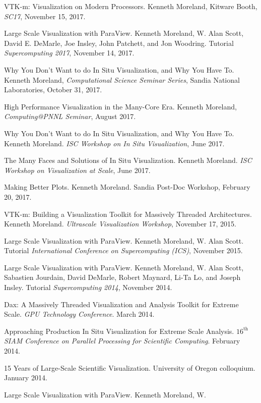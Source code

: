 \documentclass{article}
\begin{document}
\begin{enumerate}[label={[\arabic*]}]
\item VTK-m: Visualization on Modern Processors.
  Kenneth Moreland, Kitware Booth, \emph{SC17}, November 15, 2017.
\item Large Scale Visualization with ParaView.
  Kenneth Moreland, W. Alan Scott, David E. DeMarle, Joe Insley, John Patchett, and Jon Woodring.
  Tutorial \emph{Supercomputing 2017}, November 14, 2017.
\item Why You Don't Want to do In Situ Visualization, and Why You Have To.
  Kenneth Moreland, \emph{Computational Science Seminar Series}, Sandia National Laboratories, October 31, 2017.
\item High Performance Visualization in the Many-Core Era.
  Kenneth Moreland, \emph{Computing@PNNL Seminar}, August 2017.
\item Why You Don't Want to do In Situ Visualization, and Why You Have To.
  Kenneth Moreland.
  \emph{ISC Workshop on In Situ Visualization}, June 2017.
\item The Many Faces and Solutions of In Situ Visualization.
  Kenneth Moreland.
  \emph{ISC Workshop on Visualization at Scale}, June 2017.
\item Making Better Plots.
  Kenneth Moreland.
  Sandia Post-Doc Workshop, February 20, 2017.
\item VTK-m: Building a Visualization Toolkit for Massively Threaded Architectures.
  Kenneth Moreland.
  \emph{Ultrascale Visualization Workshop}, November 17, 2015.
\item Large Scale Visualization with ParaView. Kenneth Moreland, W.
  Alan Scott. Tutorial \emph{International Conference on Supercomputing
    (ICS)}, November 2015.
\item Large Scale Visualization with ParaView. Kenneth Moreland, W.
  Alan Scott, Sabastien Jourdain, David DeMarle, Robert Maynard, Li-Ta
  Lo, and Joseph Insley. Tutorial \emph{Supercomputing 2014}, November
  2014.
\item Dax: A Massively Threaded Visualization and Analysis Toolkit for
  Extreme Scale. \emph{GPU Technology Conference}. March 2014.
\item Approaching Production In Situ Visualization for Extreme Scale
  Analysis. \emph{$16^{\mathrm{th}}$ SIAM Conference on Parallel
  Processing for Scientific Computing}. February 2014.
\item 15 Years of Large-Scale Scientific Visualization. University of
  Oregon colloquium. January 2014.
\item Large Scale Visualization with ParaView. Kenneth Moreland, W.

\end{enumerate}
\end{document}
